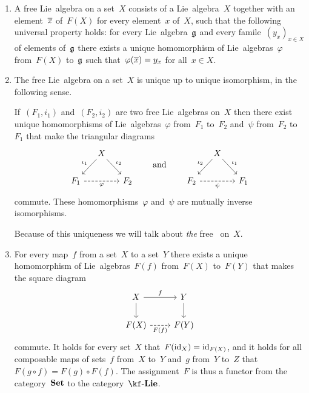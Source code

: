 \begin{remark}
  \leavevmode
  \begin{enumerate}
    \item
      A free Lie~algebra on a set~$X$ consists of a Lie~algebra~$X$ together with an element~$\overline{x}$ of~$F(X)$ for every element~$x$ of~$X$, such that the following universal property holds:
      for every Lie~algebra~$\mathfrak{g}$ and every famile~$(y_x)_{x \in X}$ of elements of~$\mathfrak{g}$ there exists a unique homomorphism of Lie~algebras~$\varphi$ from~$F(X)$ to~$\mathfrak{g}$ such that~$\varphi( \overline{x} ) = y_x$ for all~$x \in X$.
    \item
      The free Lie~algebra on a set~$X$ is unique up to unique isomorphism, in the following sense.

      If~$(F_1, i_1)$ and~$(F_2, i_2)$ are two free Lie~algebras on~$X$ then there exist unique homomorphisms of Lie~algebras~$\varphi$ from~$F_1$ to~$F_2$ and~$\psi$ from~$F_2$ to~$F_1$ that make the triangular diagrams
      \[
        \begin{tikzcd}[column sep = small]
          {}
          &
          X
          \arrow{dl}[above left]{\iota_1}
          \arrow{dr}[above right]{\iota_2}
          &
          {}
          \\
          F_1
          \arrow[dashed]{rr}[below]{\varphi}
          &
          {}
          &
          F_2
        \end{tikzcd}
        \qquad\text{and}\qquad
        \begin{tikzcd}[column sep = small]
          {}
          &
          X
          \arrow{dl}[above left]{\iota_2}
          \arrow{dr}[above right]{\iota_1}
          &
          {}
          \\
          F_2
          \arrow[dashed]{rr}[below]{\psi}
          &
          {}
          &
          F_1
        \end{tikzcd}
      \]
      commute.
      These homomorphisms~$\varphi$ and~$\psi$ are mutually inverse isomorphisms.

      Because of this uniqueness we will talk about \emph{the} free~\liealgebra{$\kf$} on~$X$.
    \item
      For every map~$f$ from a set~$X$ to a set~$Y$ there exists a unique homomorphism of Lie~algebras~$F(f)$ from~$F(X)$ to~$F(Y)$ that makes the square diagram
      \[
        \begin{tikzcd}
          X
          \arrow{r}[above]{f}
          \arrow{d}
          &
          Y
          \arrow{d}
          \\
          F(X)
          \arrow[dashed]{r}[below]{F(f)}
          &
          F(Y)
        \end{tikzcd}
      \]
      commute.
      It holds for every set~$X$ that~$F(\mathrm{id}_X) = \mathrm{id}_{F(X)}$, and it holds for all composable maps of sets~$f$ from~$X$ to~$Y$ and~$g$ from~$Y$ to~$Z$ that~$F(g \circ f) = F(g) \circ F(f)$.
      The assignment~$F$ is thus a functor from the category~$\mathbf{Set}$ to the category~$\cLie{\kf}$.
      

\end{enumerate}
\end{remark}

